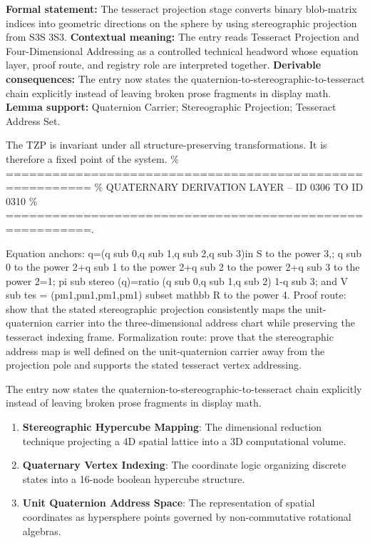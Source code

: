 \begingroup\footnotesize\setlength{\emergencystretch}{3em}\sloppy
\textbf{Formal statement:} The tesseract projection stage converts binary blob-matrix indices into geometric directions on the sphere by using stereographic projection from S3S 3S3. \textbf{Contextual meaning:} The entry reads Tesseract Projection and Four-Dimensional Addressing as a controlled technical headword whose equation layer, proof route, and registry role are interpreted together. \textbf{Derivable consequences:} The entry now states the quaternion-to-stereographic-to-tesseract chain explicitly instead of leaving broken prose fragments in display math. \textbf{Lemma support:} Quaternion Carrier; Stereographic Projection; Tesseract Address Set.\par
\endgroup

The TZP is invariant under all structure-preserving transformations. It is therefore a fixed point of the system. \% ========================================================= \% QUATERNARY DERIVATION LAYER -- ID 0306 TO ID 0310 \% =========================================================.

Equation anchors: q=(q sub 0,q sub 1,q sub 2,q sub 3)in S to the power 3,; q sub 0 to the power 2+q sub 1 to the power 2+q sub 2 to the power 2+q sub 3 to the power 2=1; pi sub stereo (q)=ratio (q sub 0,q sub 1,q sub 2) 1-q sub 3; and V sub tes = (pm1,pm1,pm1,pm1) subset mathbb R to the power 4. Proof route: show that the stated stereographic projection consistently maps the unit-quaternion carrier into the three-dimensional address chart while preserving the tesseract indexing frame. Formalization route: prove that the stereographic address map is well defined on the unit-quaternion carrier away from the projection pole and supports the stated tesseract vertex addressing.

The entry now states the quaternion-to-stereographic-to-tesseract chain explicitly instead of leaving broken prose fragments in display math.
\endgroup

\begin{enumerate}[leftmargin=1.6em,itemsep=6pt,topsep=4pt]
\item \textbf{Stereographic Hypercube Mapping}: The dimensional reduction technique projecting a 4D spatial lattice into a 3D computational volume.
\item \textbf{Quaternary Vertex Indexing}: The coordinate logic organizing discrete states into a 16-node boolean hypercube structure.
\item \textbf{Unit Quaternion Address Space}: The representation of spatial coordinates as hypersphere points governed by non-commutative rotational algebras.
\end{enumerate}

